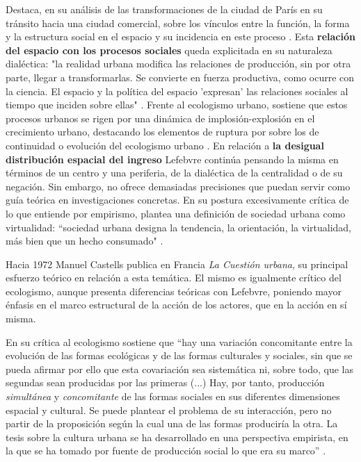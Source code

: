 Destaca, en su análisis de las transformaciones de la ciudad de París en su tránsito hacia una ciudad comercial, sobre los vínculos entre la función, la forma y la estructura social en el espacio y su incidencia en este proceso \cite[~17]{lefebvre}. Esta \textbf{relación del espacio con los procesos sociales} queda explicitada en su naturaleza dialéctica: "la realidad urbana modifica las relaciones de producción, sin por otra parte, llegar a transformarlas. Se convierte en fuerza productiva, como ocurre con la ciencia. El espacio y la política del espacio 'expresan' las relaciones sociales al tiempo que inciden sobre ellas" \cite[~21]{lefebvre}. Frente al ecologismo urbano, sostiene que estos procesos urbanos se rigen por una dinámica de implosión-explosión en el crecimiento urbano, destacando los elementos de ruptura por sobre los de continuidad o evolución del ecologismo urbano \cite[~20]{lefebvre}. En relación a \textbf{la desigual distribución espacial del ingreso} Lefebvre continúa pensando la misma en términos de un centro y una periferia, de la dialéctica de la centralidad o de su negación. Sin embargo, no ofrece demasiadas precisiones que puedan servir como guía teórica en investigaciones concretas. En su postura excesivamente crítica de lo que entiende por empirismo, plantea una definición de sociedad urbana como virtualidad: “sociedad urbana designa la tendencia, la orientación, la virtualidad, más bien que un hecho consumado" \cite[~8]{lefebvre}. 


Hacia 1972 Manuel Castells publica en Francia \textit{La Cuestión urbana}, su principal esfuerzo teórico en relación a esta temática. El mismo es igualmente crítico del ecologismo, aunque presenta diferencias teóricas con Lefebvre, poniendo mayor énfasis en el marco estructural de la acción de los actores, que en la acción en sí misma. 

En su crítica al ecologismo  sostiene que “hay una variación concomitante entre la evolución de las formas ecológicas y de las formas culturales y sociales, sin que se pueda afirmar por ello que esta covariación sea sistemática ni, sobre todo, que las segundas sean producidas por las primeras (...) Hay, por tanto, producción \textit{simultánea} y \textit{concomitante} de las formas sociales en sus diferentes dimensiones espacial y cultural. Se puede plantear el problema de su interacción, pero no partir de la proposición según la cual una de las formas produciría la otra. La tesis sobre la cultura urbana se ha desarrollado en una perspectiva empirista, en la que se ha tomado por fuente de producción social lo que era su marco” \cite[~104]{castells} .


